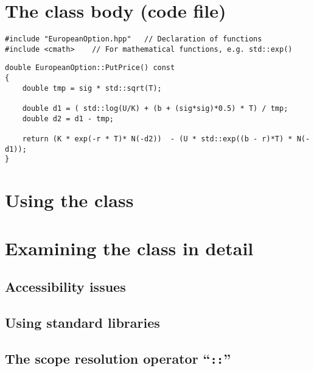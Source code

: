 \section{The class body (code file)}

\begin{lstlisting}
#include "EuropeanOption.hpp"	// Declaration of functions
#include <cmath>	// For mathematical functions, e.g. std::exp()
\end{lstlisting}

\begin{lstlisting}
double EuropeanOption::PutPrice() const
{
	double tmp = sig * std::sqrt(T);

	double d1 = ( std::log(U/K) + (b + (sig*sig)*0.5) * T) / tmp;
	double d2 = d1 - tmp;

	return (K * exp(-r * T)* N(-d2))  - (U * std::exp((b - r)*T) * N(-d1));
}
\end{lstlisting}




\section{Using the class}





\section{Examining the class in detail}

\subsection{Accessibility issues}

\subsection{Using standard libraries}

\subsection{The scope resolution operator ``\texttt{::}''}

